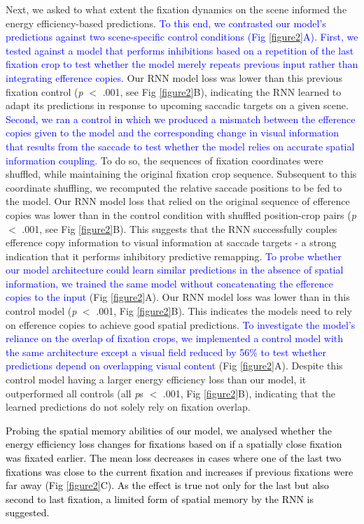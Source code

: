 \documentclass[10pt,letterpaper]{article}
\begin{document}
Next, we asked to what extent the fixation dynamics on the scene informed the energy efficiency-based predictions. \textcolor{blue}{To this end, we contrasted our model's predictions against two scene-specific control conditions (Fig \ref{figure2}A). First, we tested against a model that performs inhibitions based on a repetition of the last fixation crop to test whether the model merely repeats previous input rather than integrating efference copies.} Our RNN model loss was lower than this previous fixation control (\textit{p} $<$ .001, see Fig \ref{figure2}B), indicating the RNN learned to adapt its predictions in response to upcoming saccadic targets on a given scene. \textcolor{blue}{Second, we ran a control in which we produced a mismatch between the efference copies given to the model and the corresponding change in visual information that results from the saccade to test whether the model relies on accurate spatial information coupling.} To do so, the sequences of fixation coordinates were shuffled, while maintaining the original fixation crop sequence. Subsequent to this coordinate shuffling, we recomputed the relative saccade positions to be fed to the model. Our RNN model loss that relied on the original sequence of efference copies was lower than in the control condition with shuffled position-crop pairs (\textit{p} $<$ .001, see Fig \ref{figure2}B). This suggests that the RNN successfully couples efference copy information to visual information at saccade targets - a strong indication that it performs inhibitory predictive remapping. \textcolor{blue}{To probe whether our model architecture could learn similar predictions in the absence of spatial information, we trained the same model without concatenating the efference copies to the input} (Fig \ref{figure2}A). Our RNN model loss was lower than in this control model (\textit{p} $<$ .001, Fig \ref{figure2}B). This indicates the models need to rely on efference copies to achieve good spatial predictions. \textcolor{blue}{To investigate the model's reliance on the overlap of fixation crops, we implemented a control model with the same architecture except a visual field reduced by 56\% to test whether predictions depend on overlapping visual content} (Fig \ref{figure2}A). Despite this control model having a larger energy efficiency loss than our model, it outperformed all controls (all \textit{p}s $<$ .001, Fig \ref{figure2}B), indicating that the learned predictions do not solely rely on fixation overlap.

\textcolor{black}{Probing the spatial memory abilities of our model, we analysed  whether the energy efficiency loss changes for fixations based on if a spatially close fixation was fixated earlier. The mean loss decreases in cases where one of the last two fixations was close to the current fixation and increases if previous fixations were far away (Fig \ref{figure2}C). As the effect is true not only for the last but also second to last fixation, a limited form of spatial memory by the RNN is suggested.}
\end{document}
